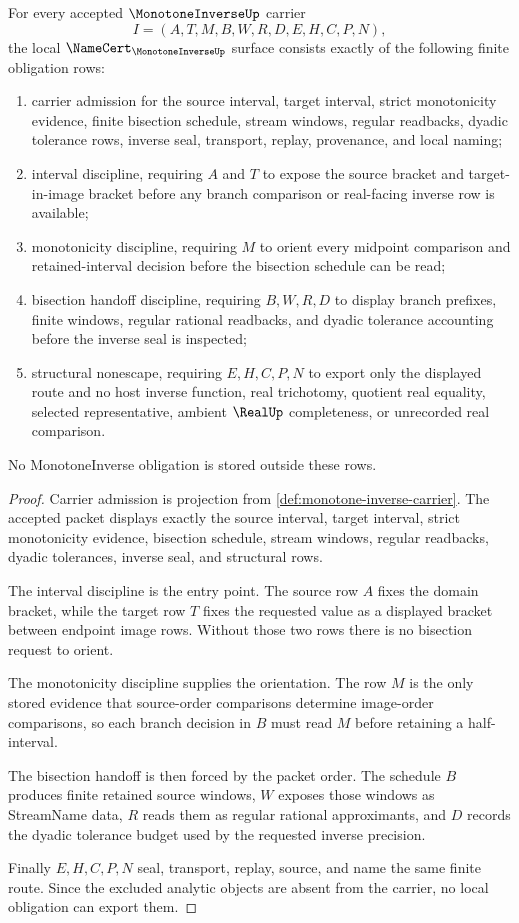 \begin{theorem}
\label{thm:monotone-inverse-namecert-obligations}
For every accepted $\MonotoneInverseUp$ carrier
$$
I=(A,T,M,B,W,R,D,E,H,C,P,N),
$$
the local $\NameCert_{\MonotoneInverseUp}$ surface consists exactly of the following finite obligation rows:
\begin{enumerate}
\item carrier admission for the source interval, target interval, strict monotonicity evidence, finite bisection schedule, stream windows, regular readbacks, dyadic tolerance rows, inverse seal, transport, replay, provenance, and local naming;
\item interval discipline, requiring $A$ and $T$ to expose the source bracket and target-in-image bracket before any branch comparison or real-facing inverse row is available;
\item monotonicity discipline, requiring $M$ to orient every midpoint comparison and retained-interval decision before the bisection schedule can be read;
\item bisection handoff discipline, requiring $B,W,R,D$ to display branch prefixes, finite windows, regular rational readbacks, and dyadic tolerance accounting before the inverse seal is inspected;
\item structural nonescape, requiring $E,H,C,P,N$ to export only the displayed route and no host inverse function, real trichotomy, quotient real equality, selected representative, ambient $\RealUp$ completeness, or unrecorded real comparison.
\end{enumerate}
No MonotoneInverse obligation is stored outside these rows.
\end{theorem}
\begin{proof}
Carrier admission is projection from \autoref{def:monotone-inverse-carrier}. The accepted packet displays exactly the source interval, target interval, strict monotonicity evidence, bisection schedule, stream windows, regular readbacks, dyadic tolerances, inverse seal, and structural rows.

The interval discipline is the entry point. The source row $A$ fixes the domain bracket, while the target row $T$ fixes the requested value as a displayed bracket between endpoint image rows. Without those two rows there is no bisection request to orient.

The monotonicity discipline supplies the orientation. The row $M$ is the only stored evidence that source-order comparisons determine image-order comparisons, so each branch decision in $B$ must read $M$ before retaining a half-interval.

The bisection handoff is then forced by the packet order. The schedule $B$ produces finite retained source windows, $W$ exposes those windows as StreamName data, $R$ reads them as regular rational approximants, and $D$ records the dyadic tolerance budget used by the requested inverse precision.

Finally $E,H,C,P,N$ seal, transport, replay, source, and name the same finite route. Since the excluded analytic objects are absent from the carrier, no local obligation can export them.
\end{proof}

